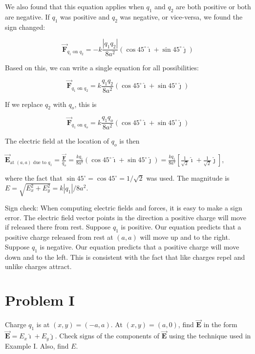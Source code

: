 \documentclass{article}
\newcommand{\ds}[0]{\displaystyle}
\newcommand{\ihat}[0]{\hat{\boldsymbol{\imath}}}
\newcommand{\jhat}[0]{\hat{\boldsymbol{\jmath}}}
\newcommand{\bfvec}[1]{\vec{\mathbf{#1}}}
\begin{document}
We also found that this equation applies when $q_1$ and $q_2$ are both positive or both are negative. If $q_1$ was positive and $q_2$ was negative, or vice-versa, we found the sign changed:

\begin{equation}
\bfvec{F}_{q_1\text{ on } q_2}=-k\frac{|q_1q_2|}{8a^2}(\cos 45^\circ \ihat + \sin 45^\circ \jhat)
\end{equation}

Based on this, we can write a single equation for all possibilities:

\begin{equation}
\bfvec{F}_{q_1\text{ on } q_2}=k\frac{q_1q_2}{8a^2}(\cos 45^\circ \ihat + \sin 45^\circ \jhat)
\end{equation}

If we replace $q_2$ with $q_o$, this is

\begin{equation}
\bfvec{F}_{q_1\text{ on } q_o}=k\frac{q_1q_o}{8a^2}(\cos 45^\circ \ihat + \sin 45^\circ \jhat)
\end{equation}

The electric field at the location of $q_o$ is then 

$\ds\bfvec{E}_{\text{at }(a,a) \text{ due to }q_1} = \frac{\bfvec{F}}{q_o} = \frac{kq_1}{8a^2}(\cos 45^\circ \ihat + \sin 45^\circ \jhat) =\frac{kq_1}{8a^2}\left[\frac{1}{\sqrt{2}}\ihat + \frac{1}{\sqrt{2}}\jhat\right]$,

where the fact that $\sin 45^\circ=\cos 45^\circ=1/\sqrt{2}$ was used. The magnitude is $E=\sqrt{E_x^2+E_y^2}=k|q_1|/8a^2$.

Sign check: When computing electric fields and forces, it is easy to make a sign error. The electric field vector points in the direction a positive charge will move if released there from rest. Suppose $q_1$ is positive. Our equation predicts that a positive charge released from rest at $(a, a)$ will move up and to the right. Suppose $q_1$ is negative. Our equation predicts that a positive charge will move down and to the left. This is consistent with the fact that like charges repel and unlike charges attract.

\section{Problem I}

Charge $q_1$ is at $(x,y)=(-a,a)$. At $(x,y)=(a, 0)$, find $\bfvec{E}$ in the form $\bfvec{E}=E_x\ihat + E_y\jhat$. Check signs of the components of $\bfvec{E}$ using the technique used in Example I. Also, find $E$.
\end{document}
